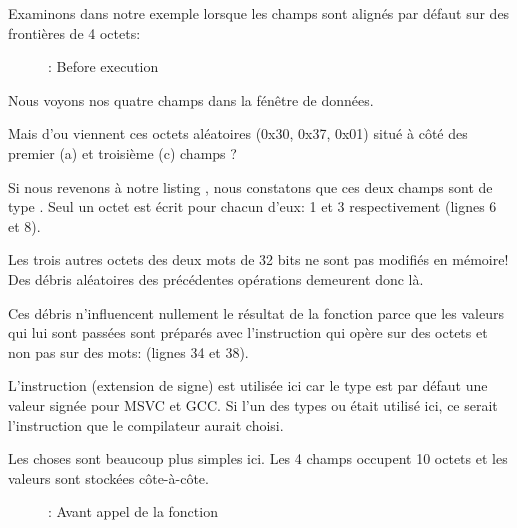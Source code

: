 ﻿\clearpage
{}
\myindex{\olly}

Examinons dans \olly notre exemple lorsque les champs sont alignés par défaut sur des frontières de 4 octets:

\begin{figure}[H]
\centering
{}
\caption{\olly: Before \printf execution}
\label{fig:packing_olly_4}
\end{figure}

Nous voyons nos quatre champs dans la fénêtre de données.

Mais d'ou viennent ces octets aléatoires (0x30, 0x37, 0x01) situé à côté des premier (a) et troisième (c)
champs ?

Si nous revenons à notre listing , nous constatons que ces deux champs sont de
type \Tchar. Seul un octet est écrit pour chacun d'eux: 1 et 3 respectivement (lignes 6 et 8).

Les trois autres octets des deux mots de 32 bits ne sont pas modifiés en mémoire! Des débris aléatoires des 
précédentes opérations demeurent donc là.


Ces débris n'influencent nullement le résultat de la fonction \printf parce que les valeurs qui lui sont 
passées sont préparés avec l'instruction \MOVSX qui opère sur des octets et non pas sur des mots: 
 (lignes 34 et 38).

L'instruction \MOVSX (extension de signe) est utilisée ici car le type \Tchar est par défaut une valeur 
signée pour MSVC et GCC. Si l'un des types  ou  était utilisé ici, ce serait 
l'instruction \MOVZX que le compilateur aurait choisi.

\clearpage
{}
\myindex{\olly}

Les choses sont beaucoup plus simples ici. Les 4 champs occupent 10 octets et les valeurs sont stockées 
côte-à-côte.

\begin{figure}[H]
\centering
{}
\caption{\olly: Avant appel de la fonction \printf}
\label{fig:packing_olly_1}
\end{figure}
